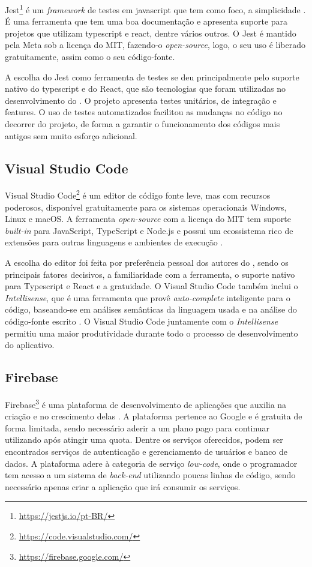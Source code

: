 Jest\footnote{\url{https://jestjs.io/pt-BR/}} é um \textit{framework} de testes em javascript que tem como foco, a simplicidade \cite{jest}. É uma ferramenta que tem uma boa documentação e apresenta suporte para projetos que utilizam typescript e react, dentre vários outros. O Jest é mantido pela Meta sob a licença do MIT, fazendo-o \textit{open-source}, logo, o seu uso é liberado gratuitamente, assim como o seu código-fonte.

A escolha do Jest como ferramenta de testes se deu principalmente pelo suporte nativo do typescript e do React, que são tecnologias que foram utilizadas no desenvolvimento do \appName. O projeto apresenta testes unitários, de integração e features. O uso de testes automatizados facilitou as mudanças no código no decorrer do projeto, de forma a garantir o funcionamento dos códigos mais antigos sem muito esforço adicional.

\subsection{Visual Studio Code}

Visual Studio Code\footnote{\url{https://code.visualstudio.com/}} é um editor de código fonte leve, mas com recursos poderosos, disponível gratuitamente para os sistemas operacionais Windows, Linux e macOS. A ferramenta \textit{open-source} com a licença do MIT tem suporte \textit{built-in} para JavaScript, TypeScript e Node.js e possui um ecossistema rico de extensões para outras linguagens e ambientes de execução \cite{vscode}.

A escolha do editor foi feita por preferência pessoal dos autores do \appName, sendo os principais fatores decisivos, a familiaridade com a ferramenta, o suporte nativo para Typescript e React e a gratuidade. O Visual Studio Code também inclui o \textit{Intellisense}, que é uma ferramenta que provê \textit{auto-complete} inteligente para o código, baseando-se em análises semânticas da linguagem usada e na análise do código-fonte escrito \cite{intellisense}. O Visual Studio Code juntamente com o \textit{Intellisense} permitiu uma maior produtividade durante todo o processo de desenvolvimento do aplicativo.

\subsection{Firebase}
\label{firebase}

Firebase\footnote{\url{https://firebase.google.com/}} é uma plataforma de desenvolvimento de aplicações que auxilia na criação e no crescimento delas \cite{firebase}. A plataforma pertence ao Google e é gratuita de forma limitada, sendo necessário aderir a um plano pago para continuar utilizando após atingir uma quota. Dentre os serviços oferecidos, podem ser encontrados serviços de autenticação e gerenciamento de usuários e banco de dados. A plataforma adere à categoria de serviço \textit{low-code}, onde o programador tem acesso a um sistema de \textit{back-end} utilizando poucas linhas de código, sendo necessário apenas criar a aplicação que irá consumir os serviços.

